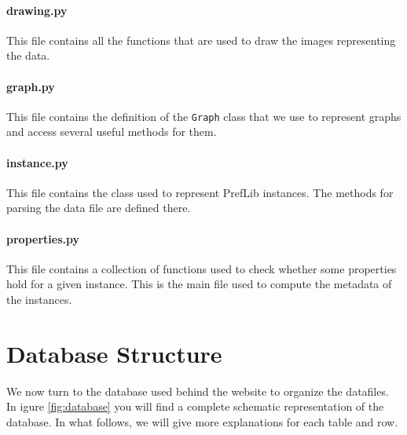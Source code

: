 \documentclass{report}
\begin{document}
	\paragraph*{\faFileO{} drawing.py} This file contains all the functions that are used to draw the images representing the data. 
	
	\paragraph*{\faFileO{} graph.py} This file contains the definition of the \texttt{Graph} class that we use to represent graphs and access several useful methods for them.
	
	\paragraph*{\faFileO{} instance.py} This file contains the class used to represent PrefLib instances. The methods for parsing the data file are defined there.
	
	\paragraph*{\faFileO{} properties.py} This file contains a collection of functions used to check whether some properties hold for a given instance. This is the main file used to compute the metadata of the instances.
	
	
	\section{Database Structure}
	
	We now turn to the database used behind the website to organize the datafiles. In igure \ref{fig:database} you will find a complete schematic representation of the database. In what follows, we will give more explanations for each table and row.
	
\end{document}
